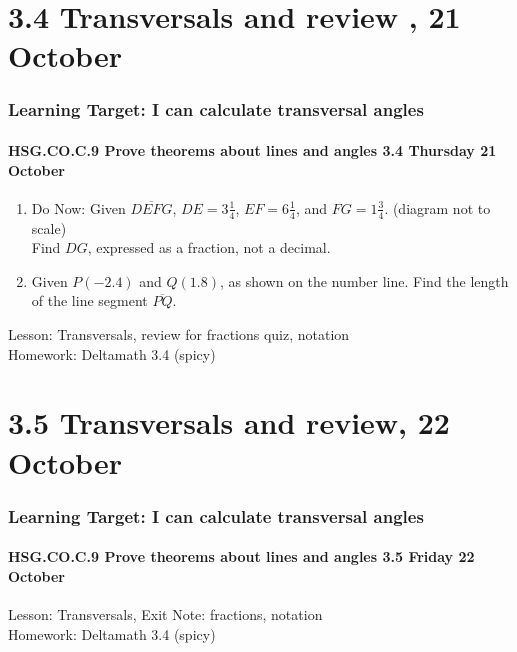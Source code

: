 \documentclass{beamer}
\begin{document}
\section{3.4 Transversals and review , 21 October}
\frame
{
  \frametitle{Learning Target: I can calculate transversal angles}
  \framesubtitle{HSG.CO.C.9 Prove theorems about lines and angles  \hfill \alert{3.4 Thursday 21 October}}
  \begin{enumerate}

  \item Do Now: Given $\overline{DEFG}$, $DE=3 \frac{1}{4}$, $EF=6 \frac{1}{4}$, and $FG= 1 \frac{3}{4}$. (diagram not to scale)\\ [0.25cm]
    Find ${DG}$, expressed as a fraction, not a decimal.
    \begin{flushleft}
      \end{flushleft}
  
      \item Given $P(-2.4)$ and $Q(1.8)$, as shown on the number line. 
    Find the length of the line segment $\overline{PQ}$. 
    \begin{flushright}
    \end{flushright}
  \end{enumerate}
  Lesson: Transversals, review for fractions quiz, notation \\[0.25cm]
  Homework: Deltamath 3.4 (spicy)
}

\section{3.5 Transversals and review, 22 October}
\frame
{
  \frametitle{Learning Target: I can calculate transversal angles}
  \framesubtitle{HSG.CO.C.9 Prove theorems about lines and angles  \hfill \alert{3.5 Friday 22 October}}

  Lesson: Transversals, Exit Note: fractions, notation \\[0.25cm]
  Homework: Deltamath 3.4 (spicy)
}
\end{document}
